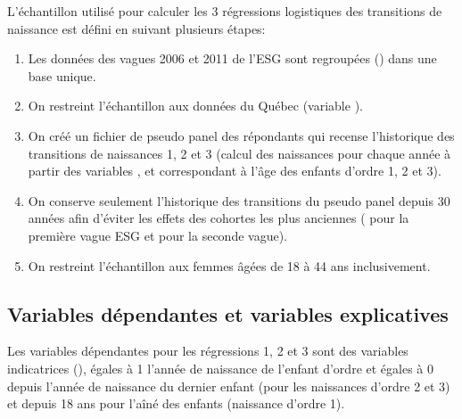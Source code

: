 \documentclass[letterpaper,10pt,french]{sphinxmanual}
\begin{document}
L’échantillon utilisé pour calculer les 3 régressions logistiques des transitions de naissance est défini en suivant plusieurs étapes:
\begin{enumerate}
%
\item {} 
Les données des vagues 2006 et 2011 de l’ESG sont regroupées () dans une base unique.

\item {} 
On restreint l’échantillon aux données du Québec (variable ).

\item {} 
On créé un fichier de pseudo panel des répondants qui recense l’historique des transitions de naissances 1, 2 et 3 (calcul des naissances pour chaque année à partir des variables ,  et  correspondant à l’âge des enfants d’ordre 1, 2 et 3).

\item {} 
On conserve seulement l’historique des transitions du pseudo panel depuis 30 années afin d’éviter les effets des cohortes les plus anciennes ( pour la première vague ESG et  pour la seconde vague).

\item {} 
On restreint l’échantillon aux femmes âgées de 18 à 44 ans inclusivement.

\end{enumerate}


\subsection{Variables dépendantes et variables explicatives}
\label{\detokenize{transition_models:variables-dependantes-et-variables-explicatives}}
Les variables dépendantes pour les régressions 1, 2 et 3 sont des variables indicatrices (), égales à 1 l’année de naissance de l’enfant d’ordre  et égales à 0 depuis l’année de naissance du dernier enfant (pour les naissances d’ordre 2 et 3) et depuis 18 ans pour l’aîné des enfants (naissance d’ordre 1).
\end{document}
